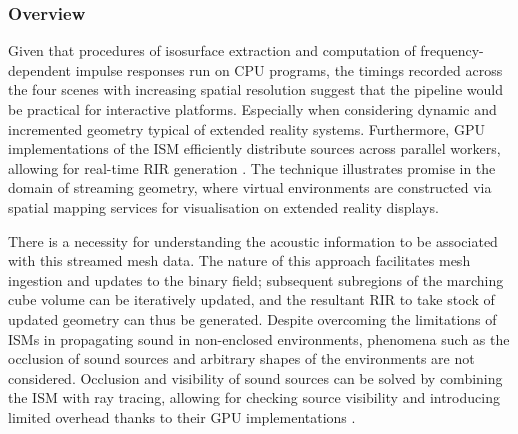 \subsubsection{Overview}
Given that procedures of isosurface extraction and computation of frequency-dependent impulse responses run on CPU programs, the timings recorded across the four scenes with increasing spatial resolution suggest that the pipeline would be practical for interactive platforms. Especially when considering dynamic and incremented geometry typical of extended reality systems. Furthermore, GPU implementations of the ISM efficiently distribute sources across parallel workers, allowing for real-time RIR generation \citep{diaz2021gpurir}. The technique illustrates promise in the domain of streaming geometry, where virtual environments are constructed via spatial mapping services for visualisation on extended reality displays. \par
There is a necessity for understanding the acoustic information to be associated with this streamed mesh data. The nature of this approach facilitates mesh ingestion and updates to the binary field; subsequent subregions of the marching cube volume can be iteratively updated, and the resultant RIR to take stock of updated geometry can thus be generated. Despite overcoming the limitations of ISMs in propagating sound in non-enclosed environments, phenomena such as the occlusion of sound sources and arbitrary shapes of the environments are not considered. Occlusion and visibility of sound sources can be solved by combining the ISM with ray tracing, allowing for checking source visibility and introducing limited overhead thanks to their GPU implementations \citep{taylor2012guided}. \par

